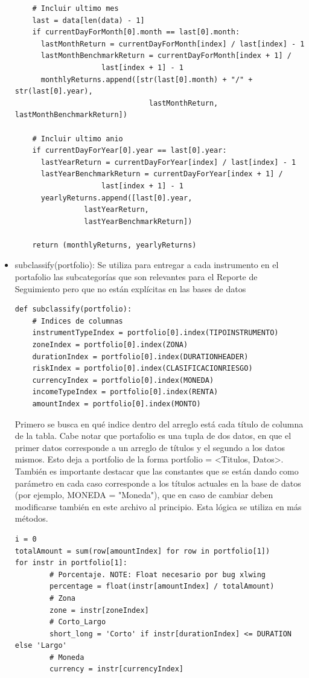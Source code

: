 \documentclass{article}
\begin{document}
\begin{itemize}
\begin{lstlisting}
    # Incluir ultimo mes
    last = data[len(data) - 1]
    if currentDayForMonth[0].month == last[0].month:
      lastMonthReturn = currentDayForMonth[index] / last[index] - 1
      lastMonthBenchmarkReturn = currentDayForMonth[index + 1] /
      				last[index + 1] - 1
      monthlyReturns.append([str(last[0].month) + "/" + str(last[0].year),
                               lastMonthReturn, lastMonthBenchmarkReturn])

    # Incluir ultimo anio
    if currentDayForYear[0].year == last[0].year:
      lastYearReturn = currentDayForYear[index] / last[index] - 1
      lastYearBenchmarkReturn = currentDayForYear[index + 1] /
      				last[index + 1] - 1
      yearlyReturns.append([last[0].year,
      			lastYearReturn,
      			lastYearBenchmarkReturn])

    return (monthlyReturns, yearlyReturns)
\end{lstlisting}

\item subclassify(portfolio): Se utiliza para entregar a cada instrumento en el portafolio las subcategorías que son relevantes para el Reporte de Seguimiento pero que no están explícitas en las bases de datos

\begin{lstlisting}
def subclassify(portfolio):
    # Indices de columnas
    instrumentTypeIndex = portfolio[0].index(TIPOINSTRUMENTO)
    zoneIndex = portfolio[0].index(ZONA)
    durationIndex = portfolio[0].index(DURATIONHEADER)
    riskIndex = portfolio[0].index(CLASIFICACIONRIESGO)
    currencyIndex = portfolio[0].index(MONEDA)
    incomeTypeIndex = portfolio[0].index(RENTA)
    amountIndex = portfolio[0].index(MONTO)
\end{lstlisting}

Primero se busca en qué indice dentro del arreglo está cada título de columna de la tabla. Cabe notar que portafolio es una tupla de dos datos, en que el primer datos corresponde a un arreglo de títulos y el segundo a los datos mismos. Esto deja a portfolio de la forma portfolio = <Titulos, Datos>. También es importante destacar que las constantes que se están dando como parámetro en cada caso corresponde a los títulos actuales en la base de datos (por ejemplo, MONEDA = "Moneda"), que en caso de cambiar deben modificarse también en este archivo al principio. Esta lógica se utiliza en más métodos.

\begin{lstlisting}
i = 0
totalAmount = sum(row[amountIndex] for row in portfolio[1])
for instr in portfolio[1]:
        # Porcentaje. NOTE: Float necesario por bug xlwing
        percentage = float(instr[amountIndex] / totalAmount)
        # Zona
        zone = instr[zoneIndex]
        # Corto_Largo
        short_long = 'Corto' if instr[durationIndex] <= DURATION else 'Largo'
        # Moneda
        currency = instr[currencyIndex]
\end{lstlisting}


\end{itemize}
\end{document}
